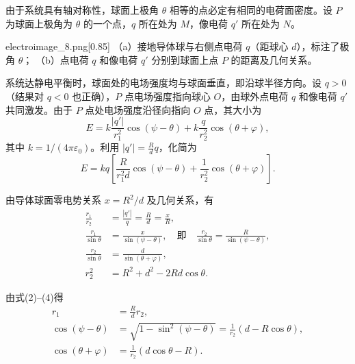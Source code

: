 \setcounter{solution}{0}
\renewcommand{\thesolution}{\arabic{solution}}

\begin{solution}[接地导体球的表面电荷分布]
    \label{solution_ei_1}
    由于系统具有轴对称性，球面上极角 $\theta$ 相等的点必定有相同的电荷面密度。设 $P$ 为球面上极角为 $\theta$ 的一个点，$q$ 所在处为 $M$，像电荷 $q'$ 所在处为 $N$。

    \begin{singlefigure}{electroimage_8.png}[0.85]
        （a）接地导体球与右侧点电荷 $q$（距球心 $d$），标注了极角 $\theta$；
        （b）点电荷 $q$ 和像电荷 $q'$ 分别到球面上点 $P$ 的距离及几何关系。
    \end{singlefigure}

    系统达静电平衡时，球面处的电场强度均与球面垂直，即沿球半径方向。设 $q>0$（结果对 $q<0$ 也正确），$P$ 点电场强度指向球心 $O$，由球外点电荷 $q$ 和像电荷 $q'$ 共同激发。由于 $P$ 点处电场强度沿径向指向 $O$ 点，其大小为
    \[
        E = k \frac{|q'|}{r_1^2} \cos(\psi - \theta) + k \frac{q}{r_2^2} \cos(\theta + \varphi),
    \]
    其中 $k = 1/(4\pi\varepsilon_0)$。利用 $|q'| = \frac{R}{d}q$，化简为
    \[
        E = kq \left[ \frac{R}{r_1^2 d} \cos(\psi - \theta) + \frac{1}{r_2^2} \cos(\theta + \varphi) \right]. \tag{1}
    \]

    由导体球面零电势关系 $x = R^2/d$ 及几何关系，有
    \begin{align*}
        \frac{r_1}{r_2}        & = \frac{|q'|}{q} = \frac{R}{d} = \frac{x}{R}, \tag{2}                                                                 \\
        \frac{r_1}{\sin\theta} & = \frac{x}{\sin(\psi - \theta)}, \quad \text{即} \quad \frac{r_2}{\sin\theta} = \frac{R}{\sin(\psi - \theta)}, \tag{3} \\
        \frac{r_2}{\sin\theta} & = \frac{d}{\sin(\theta + \varphi)}, \tag{4}                                                                           \\
        r_2^2                  & = R^2 + d^2 - 2Rd \cos\theta. \tag{5}
    \end{align*}

    由式(2)--(4)得
    \begin{align*}
        r_1                    & = \frac{R}{d} r_2, \tag{6}                                                   \\
        \cos(\psi - \theta)    & = \sqrt{1 - \sin^2(\psi - \theta)} = \frac{1}{r_2}(d - R\cos\theta), \tag{7} \\
        \cos(\theta + \varphi) & = \frac{1}{r_2}(d\cos\theta - R). \tag{8}
    \end{align*}


\end{solution}
